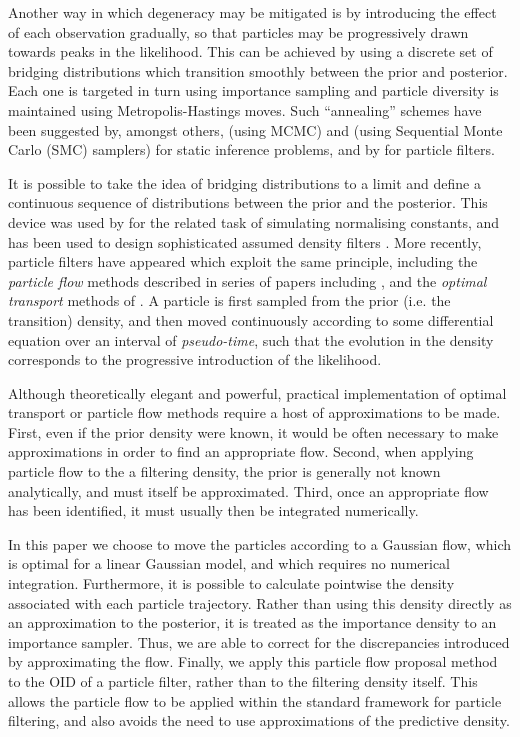 \documentclass{article}
\begin{document}
Another way in which degeneracy may be mitigated is by introducing the effect of each observation gradually, so that particles may be progressively drawn towards peaks in the likelihood. This can be achieved by using a discrete set of bridging distributions which transition smoothly between the prior and posterior. Each one is targeted in turn using importance sampling and particle diversity is maintained using Metropolis-Hastings moves. Such ``annealing'' schemes have been suggested by, amongst others, \citet{Neal2001} (using MCMC) and \citet{DelMoral2006} (using Sequential Monte Carlo (SMC) samplers) for static inference problems, and by \citet{Godsill2001b,Gall2007,Deutscher2000,Oudjane2000} for particle filters.

It is possible to take the idea of bridging distributions to a limit and define a continuous sequence of distributions between the prior and the posterior. This device was used by \citet{Gelman1998} for the related task of simulating normalising constants, and has been used to design sophisticated assumed density filters \citep{Hanebeck2003a,Hanebeck2012,Hagmar2011}. More recently, particle filters have appeared which exploit the same principle, including the \emph{particle flow} methods described in series of papers including \citep{Daum2008,Daum2011d}, and the \emph{optimal transport} methods of \cite{Reich2011,Reich2012a}. A particle is first sampled from the prior (i.e. the transition) density, and then moved continuously according to some differential equation over an interval of \emph{pseudo-time}, such that the evolution in the density corresponds to the progressive introduction of the likelihood.

Although theoretically elegant and powerful, practical implementation of optimal transport or particle flow methods require a host of approximations to be made. First, even if the prior density were known, it would be often necessary to make approximations in order to find an appropriate flow. Second, when applying particle flow to the a filtering density, the prior is generally not known analytically, and must itself be approximated. Third, once an appropriate flow has been identified, it must usually then be integrated numerically.

In this paper we choose to move the particles according to a Gaussian flow, which is optimal for a linear Gaussian model, and which requires no numerical integration. Furthermore, it is possible to calculate pointwise the density associated with each particle trajectory. Rather than using this density directly as an approximation to the posterior, it is treated as the importance density to an importance sampler. Thus, we are able to correct for the discrepancies introduced by approximating the flow. Finally, we apply this particle flow proposal method to the OID of a particle filter, rather than to the filtering density itself. This allows the particle flow to be applied within the standard framework for particle filtering, and also avoids the need to use approximations of the predictive density.
\end{document}
